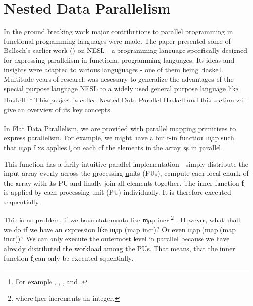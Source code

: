 \section{Nested Data Parallelism}
  \label{ndpintro}
  In the ground breaking work \cite{Belloch1996}
  major contributions to parallel programming in
  functional programming languages were made.
  The paper presented some of Belloch's earlier work (\cite{NepaBelloch1993}) on NESL
  - a programming language specifically designed for expressing parallelism
  in functional programming languages. Its ideas and insights were
  adapted to various languguages - one of them being Haskell.
  Multitude years of research was nesessary to generalize the
  advantages of the special purpose language NESL to a widely used
  general purpose language like Haskell.
  \footnote{For example \cite{Harness2008}, \cite{DPHStatus2007},
  \cite{EffiVect2012Lipp}, \cite{HighOrdFlat2006} and \cite{DistTypes1999}.}
  This project is called Nested Data Parallel Haskell and this section will give
  an overview of its key concepts.  
  
  \paragraph{}
    In Flat Data Parallelism, we are provided with parallel mapping primitives
    to express parallelism. For example, we might have a built-in
    function \c{map} such that \c{map f xs} applies \c{f}
    on each of the elements in the array \c{xs} in parallel.
    
    This function has a farily intuitive parallel implementation -
    simply distribute the input array evenly across the \underline{p}rocessing \underline{u}nits (PUs),
    compute each local chunk of the array with its PU and finally
    join all elements together.
    The inner function \c{f} is applied by each processing unit (PU) individually.
    It is therefore executed sequentially.
    
    This is no problem, if we have statements like \c{map incr}
    \footnote{where \c{incr} increments an integer.}
    . However, what shall we do if we have an expression like \c{map (map incr)}?
    Or even \c{map (map (map incr))}?
    We can only execute the outermost level in parallel because we have already
    distributed the workload among the PUs.
    That means, that the inner function \c{f} can only be executed squentially.
    
